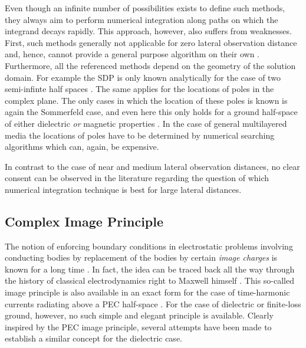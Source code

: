 Even though an infinite number of possibilities exists to define such methods,
they always aim to perform numerical integration along paths on which the
integrand decays rapidly.
This approach, however, also suffers from weaknesses.
First, such methods generally not applicable for zero lateral observation
distance and, hence, cannot provide a general purpose algorithm on their own
\cite{Michalski2016a}.
Furthermore, all the referenced methods depend on the geometry of the 
solution domain.
For example the \ac{SDP} is only known analytically for the case of two
semi-infinte half spaces \cite[\S2.5.2]{Chew1999}.
The same applies for the locations of poles in the complex plane.
The only cases in which the location of these poles is known is again
the Sommerfeld case, and even here this only holds for a ground half-space of
either dielectric \emph{or} magnetic properties \cite{Michalski2016b}.
In the case of general multilayered media the locations of poles have to be
determined by numerical searching algorithms \cite{rodriguez-berral2004}
which can, again, be expensive.

In contrast to the case of near and medium lateral observation distances,
no clear consent can be observed in the literature regarding the question of
which numerical integration technique is best for large lateral distances.










\subsection{Complex Image Principle}

The notion of enforcing boundary conditions in electrostatic problems
involving conducting bodies by replacement of the bodies by certain
\emph{image charges} is known for a long time \cite[pp.~69]{Jackson2013}.
In fact, the idea can be traced back all the way through the history of
classical electrodynamics right to Maxwell himself
\cite[Chapter~XI]{maxwell1873}.
This so-called image principle is also available in an exact form for the
case of time-harmonic currents radiating above a \ac{PEC} half-space
\cite[243]{Sommerfeld1964}\cite[pp.~94]{Jin2015}.
For the case of dielectric or finite-loss ground, however, no such simple and
elegant principle is available.
Clearly inspired by the \ac{PEC} image principle, several attempts have been
made to establish a similar concept for the dielectric case.

